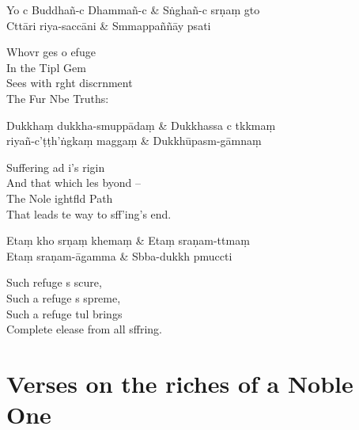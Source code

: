 \begin{twochants}
  Yo c Buddhañ-c Dhammañ-c & Sṅghañ-c srṇaṃ gto \\
  Cttāri riya-saccāni & Smmappaññāy psati \\
\end{twochants}

\begin{english}
  Whovr ges o efuge\\
  In the Tipl Gem\\
  Sees with rght discrnment\\
  The Fur Nbe Truths:
\end{english}

\begin{twochants}
  Dukkhaṃ dukkha-smuppādaṃ & Dukkhassa c tkkmaṃ \\
  riyañ-c'ṭṭh'ṅgkaṃ maggaṃ & Dukkhūpasm-gāmnaṃ \\
\end{twochants}

\begin{english}
  Suffering ad i's rigin\\
  And that which les byond --\\
  The Nole ightfld Path\\
  That leads te way to sff'ing's end.
\end{english}

\begin{twochants}
  Etaṃ kho srṇaṃ khemaṃ & Etaṃ sraṇam-ttmaṃ \\
  Etaṃ sraṇam-āgamma & Sbba-dukkh pmuccti \\
\end{twochants}

\begin{english}
  Such  refuge s scure,\\
  Such a refuge s spreme,\\
  Such a refuge tul brings\\
  Complete elease from all sffring.
\end{english}

\chapter{Verses on the riches of a Noble One}%

